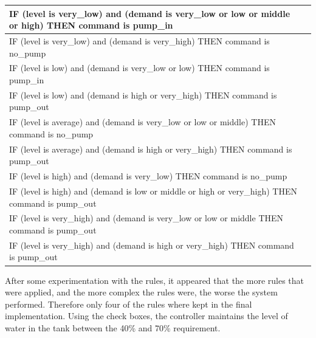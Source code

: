  \begin{longtable}{|l|>{\raggedleft\arraybackslash}p{4cm}|l|l|l}
	\hline 
 	\multicolumn{4}{|l|}{IF (level is very\_low) and (demand is very\_low or low or middle or high) THEN command is pump\_in} \\ 
 	\hline 
 	\multicolumn{4}{|l|}{IF (level is very\_low) and (demand is very\_high) THEN command is no\_pump} \\ 
 	\hline 
 	\multicolumn{4}{|l|}{IF (level is low) and (demand is very\_low or low) THEN command is pump\_in} \\ 
 	\hline 
 	\multicolumn{4}{|l|}{IF (level is low) and (demand is high or very\_high) THEN command is pump\_out} \\ 
 	\hline 
 	\multicolumn{4}{|l|}{IF (level is average) and (demand is very\_low or low or middle) THEN command is no\_pump} \\ 
 	\hline 
 	\multicolumn{4}{|l|}{IF (level is average) and (demand is high or very\_high) THEN command is pump\_out} \\ 
 	\hline 
 	\multicolumn{4}{|l|}{IF (level is high) and (demand is very\_low) THEN command is no\_pump} \\ 
 	\hline 
 	\multicolumn{4}{|l|}{IF (level is high) and (demand is low or middle or high or very\_high) THEN command is pump\_out} \\ 
 	\hline 
 	\multicolumn{4}{|l|}{IF (level is very\_high) and (demand is very\_low or low or middle THEN command is pump\_out} \\ 
 	\hline
 	\multicolumn{4}{|l|}{IF (level is very\_high) and (demand is high or very\_high) THEN command is pump\_out} \\ 
 	\hline 
 \end{longtable}

After some experimentation with the rules, it appeared that the more rules that were applied, and the more complex the rules were, the worse the system performed. Therefore only four of the rules where kept in the final implementation. Using the check boxes, the controller maintains the level of water in the tank between the 40\% and 70\% requirement.
